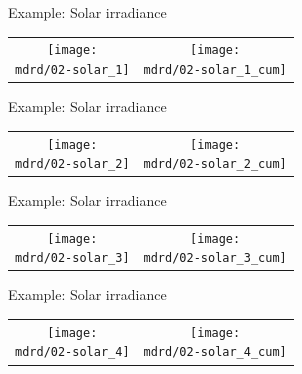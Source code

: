 \begin{frame}{Example: Solar irradiance}
\newcommand{\wmgd}{0.5\columnwidth}
\newcommand{\hmgd}{3.0cm}
\newcommand{\mdrd}{../figures/02-solar}
\newcommand{\mbm}{\hspace{-0.3cm}}
{\footnotesize

}

\vspace{\baselineskip}

\begin{tabular}{cc}
\mbm \texttt{[image: \\mdrd/02-solar\_1]} & \texttt{[image: \\mdrd/02-solar\_1\_cum]}
\end{tabular}
\end{frame}

\begin{frame}{Example: Solar irradiance}
\newcommand{\wmgd}{0.5\columnwidth}
\newcommand{\hmgd}{3.0cm}
\newcommand{\mdrd}{../figures/02-solar}
\newcommand{\mbm}{\hspace{-0.3cm}}
{\footnotesize

}

\vspace{\baselineskip}

\begin{tabular}{cc}
\mbm \texttt{[image: \\mdrd/02-solar\_2]} & \texttt{[image: \\mdrd/02-solar\_2\_cum]}
\end{tabular}
\end{frame}

\begin{frame}{Example: Solar irradiance}
\newcommand{\wmgd}{0.5\columnwidth}
\newcommand{\hmgd}{3.0cm}
\newcommand{\mdrd}{../figures/02-solar}
\newcommand{\mbm}{\hspace{-0.3cm}}
{\footnotesize

}

\vspace{\baselineskip}

\begin{tabular}{cc}
\mbm \texttt{[image: \\mdrd/02-solar\_3]} & \texttt{[image: \\mdrd/02-solar\_3\_cum]}
\end{tabular}
\end{frame}

\begin{frame}{Example: Solar irradiance}
\newcommand{\wmgd}{0.5\columnwidth}
\newcommand{\hmgd}{3.0cm}
\newcommand{\mdrd}{../figures/02-solar}
\newcommand{\mbm}{\hspace{-0.3cm}}
{\footnotesize

}

\vspace{\baselineskip}

\begin{tabular}{cc}
\mbm \texttt{[image: \\mdrd/02-solar\_4]} & \texttt{[image: \\mdrd/02-solar\_4\_cum]}
\end{tabular}
\end{frame}

